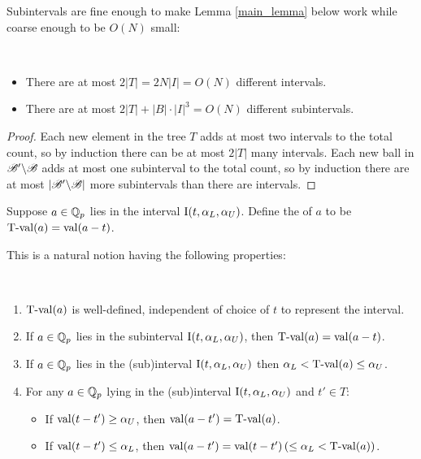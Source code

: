   

Subintervals are fine enough to make Lemma \ref{main_lemma} below work while coarse enough to be $O(N)$ small:
\begin{Lemma} \label{interval_count}\ 
  \begin{itemize}
  \item 
    There are at most $2|T| = 2 N |I| = O(N)$ different intervals.
  \item 
    There are at most $2|T| + |B| \cdot |I|^3 = O(N)$ different subintervals.
  \end{itemize}
\end{Lemma}

\begin{proof}
  Each new element in the tree $T$ adds at most two intervals to the total count,
  so by induction there can be at most $2|T|$ many intervals.
  Each new ball in $\mathscr B' \backslash \mathscr B$ adds at most one subinterval to the total count,
  so by induction there are at most $|\mathscr B' \backslash \mathscr B|$ more subintervals than there are intervals.
\end{proof}


\begin{Definition}
  Suppose $a \in \mathbb{Q}_p$ lies in the interval $\operatorname{I}(t, \alpha_L, \alpha_U)$. 
  Define the  of $a$ to be $\operatorname{T-val}(a) = \operatorname{val}(a - t)$.    
\end{Definition}

This is a natural notion having the following properties:
\begin{Lemma}  \label{tval} \ 
  \begin{enumerate}[label=(\alph*)]
  \item $\operatorname{T-val}(a)$ is well-defined, independent of choice of $t$ to represent the interval.
  \item If $a \in \mathbb{Q}_p$ lies in the subinterval $\operatorname{I}(t, \alpha_L, \alpha_U)$,
    then $\operatorname{T-val}(a) = \operatorname{val}(a - t)$.
  \item If $a \in \mathbb{Q}_p$ lies in the (sub)interval $\operatorname{I}(t, \alpha_L, \alpha_U)$ 
    then $\alpha_L < \operatorname{T-val}(a) \leq \alpha_U$.
  \item For any $a \in \mathbb{Q}_p$ lying in the (sub)interval $\operatorname{I}(t, \alpha_L, \alpha_U)$ and $t' \in T$:
    \begin{itemize}
    \item If $\operatorname{val}(t - t') \geq \alpha_U$, then $\operatorname{val}(a - t') = \operatorname{T-val}(a)$. 
    \item If $\operatorname{val}(t - t') \leq \alpha_L$, then $\operatorname{val}(a - t') = \operatorname{val}(t - t') \left(\leq \alpha_L < \operatorname{T-val}(a)\right)$. 
    \end{itemize}
  \end{enumerate}
\end{Lemma}


